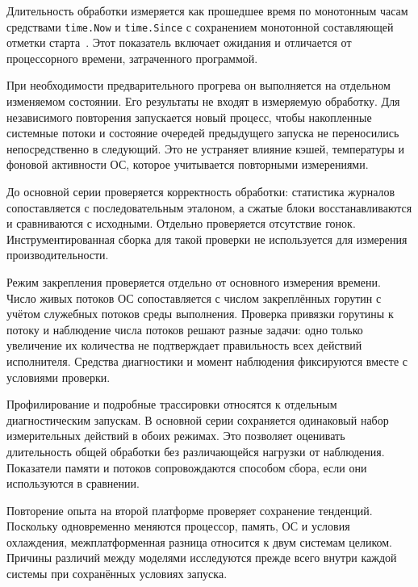Длительность обработки измеряется как прошедшее время по монотонным часам средствами
  \texttt{time.Now} и \texttt{time.Since} с сохранением монотонной составляющей отметки
  старта~\cite{go_time_package}. Этот показатель включает ожидания и отличается от процессорного
  времени, затраченного программой.

При необходимости предварительного прогрева он выполняется на отдельном изменяемом состоянии.
  Его результаты не входят в измеряемую обработку. Для независимого повторения запускается
  новый процесс, чтобы накопленные системные потоки и состояние очередей предыдущего запуска
  не переносились непосредственно в следующий. Это не устраняет влияние кэшей, температуры
  и фоновой активности ОС, которое учитывается повторными измерениями.

До основной серии проверяется корректность обработки: статистика журналов сопоставляется
  с последовательным эталоном, а сжатые блоки восстанавливаются и сравниваются с исходными.
  Отдельно проверяется отсутствие гонок. Инструментированная сборка для такой проверки
  не используется для измерения производительности.

Режим закрепления проверяется отдельно от основного измерения времени. Число живых потоков ОС
  сопоставляется с числом закреплённых горутин с учётом служебных потоков среды выполнения.
  Проверка привязки горутины к потоку и наблюдение числа потоков решают разные задачи:
  одно только увеличение их количества не подтверждает правильность всех действий исполнителя.
  Средства диагностики и момент наблюдения фиксируются вместе с условиями проверки.


Профилирование и подробные трассировки относятся к отдельным диагностическим запускам.
  В основной серии сохраняется одинаковый набор измерительных действий в обоих режимах.
  Это позволяет оценивать длительность общей обработки без различающейся нагрузки от наблюдения.
  Показатели памяти и потоков сопровождаются способом сбора, если они используются в сравнении.

Повторение опыта на второй платформе проверяет сохранение тенденций. Поскольку одновременно
  меняются процессор, память, ОС и условия охлаждения, межплатформенная разница относится
  к двум системам целиком. Причины различий между моделями исследуются прежде всего внутри
  каждой системы при сохранённых условиях запуска.

